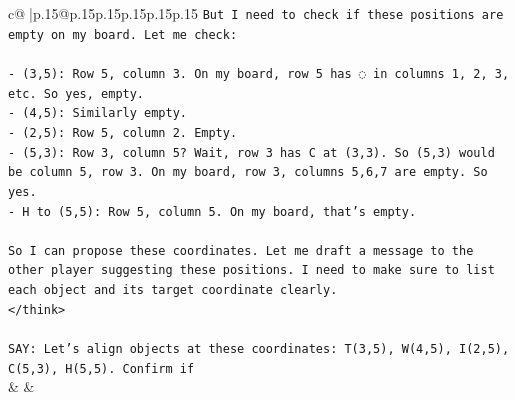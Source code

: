 \documentclass{article}
\begin{document}
{\begin{supertabular}{c@{$\;$}|p{.15\linewidth}@{}p{.15\linewidth}p{.15\linewidth}p{.15\linewidth}p{.15\linewidth}p{.15\linewidth}}
{{{\texttt{But I need to check if these positions are empty on my board. Let me check:} \\
\\ 
\texttt{{-} (3,5): Row 5, column 3. On my board, row 5 has ◌ in columns 1, 2, 3, etc. So yes, empty.} \\
\texttt{{-} (4,5): Similarly empty.} \\
\texttt{{-} (2,5): Row 5, column 2. Empty.} \\
\texttt{{-} (5,3): Row 3, column 5? Wait, row 3 has C at (3,3). So (5,3) would be column 5, row 3. On my board, row 3, columns 5,6,7 are empty. So yes.} \\
\texttt{{-} H to (5,5): Row 5, column 5. On my board, that's empty.} \\
\\ 
\texttt{So I can propose these coordinates. Let me draft a message to the other player suggesting these positions. I need to make sure to list each object and its target coordinate clearly.} \\
\texttt{</think>} \\
\\ 
\texttt{SAY: Let's align objects at these coordinates: T(3,5), W(4,5), I(2,5), C(5,3), H(5,5). Confirm if} \\
            }
        }
    }
    & & \\ \\


\end{supertabular}}
\end{document}
